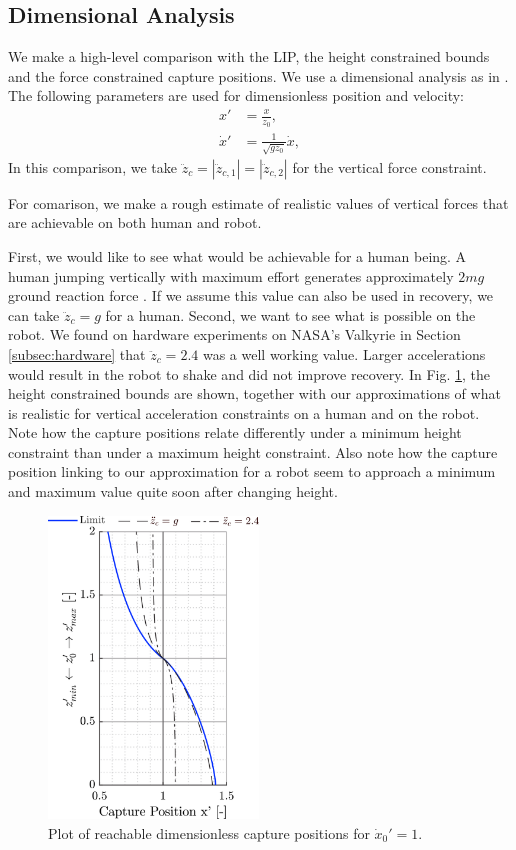 \documentclass[letterpaper, 10 pt, conference]{ieeeconf}  %
\newcommand{\ddzc}{\ddot{z}_{c}}
\newcommand{\ddzcf}{\ddot{z}_{c,1}}
\newcommand{\ddzcs}{\ddot{z}_{c,2}}
\begin{document}
\subsection{Dimensional Analysis}\label{sec:comparison}
We make a high-level comparison with the LIP, the height constrained bounds and the force constrained capture positions. We use a dimensional analysis as in \cite{pratt2006capture,stephens2007humanoid,koolen2012capturability}. The following parameters are used for dimensionless position and velocity:
\begin{align}
	x' &= \frac{x}{z_0}, \\
	\dot{x}' &= \frac{1}{\sqrt{gz_0}}\dot{x},
\end{align}
In this comparison, we take $\ddzc=|\ddzcf|=|\ddzcs|$ for the vertical force constraint.

For comarison, we make a rough estimate of realistic values of vertical forces that are achievable on both human and robot.

First, we would like to see what would be achievable for a human being. A human jumping vertically with maximum effort generates approximately $2mg$ ground reaction force \cite{linthorne2001analysis}. If we assume this value can also be used in recovery, we can take $\ddot{z}_c=g$ for a human. Second, we want to see what is possible on the robot. We found on hardware experiments on NASA's Valkyrie in Section \ref{subsec:hardware} that $\ddot{z}_c=2.4$ was a well working value. Larger accelerations would result in the robot to shake and did not improve recovery. In Fig. \ref{fig:caplimits}, the height constrained bounds are shown, together with our approximations of what is realistic for vertical acceleration constraints on a human and on the robot. Note how the capture positions relate differently under a minimum height constraint than under a maximum height constraint. Also note how the capture position linking to our approximation for a robot seem to approach a minimum and maximum value quite soon after changing height.
\begin{figure}
      \centering
      \includegraphics[width=2.2in]{caplimits.png}
      \caption{Plot of reachable dimensionless capture positions for $\dot{x}_0'=1$. }
      \label{fig:caplimits}
\end{figure}
\end{document}
